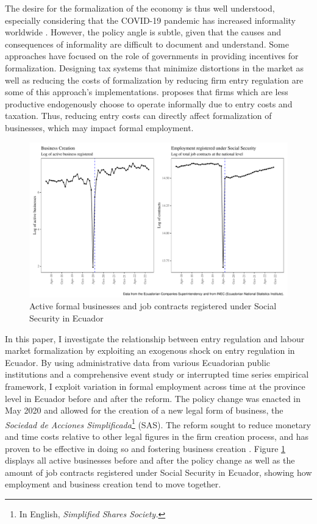 \documentclass[11pt,a4paper]{article}\usepackage[]{graphicx}\usepackage[]{xcolor}
\makeatletter
\def\maxwidth{ %
  \ifdim\Gin@nat@width>\linewidth
    \linewidth
  \else
    \Gin@nat@width
  \fi
}
\newenvironment{knitrout}{}{} %
\makeatother
\begin{document}
The desire for the formalization of the economy is thus well understood, especially considering that the COVID-19 pandemic has increased informality worldwide \parencite{ILO.2022}. However, the policy angle is subtle, given that the causes and consequences of informality are difficult to document and understand. Some approaches have focused on the role of governments in providing incentives for formalization. Designing tax systems that minimize distortions in the market \parencite{Bardey.2019} as well as reducing the costs of formalization by reducing firm entry regulation are some of this approach's implementations. \textcite{MauricioPrado.2011} proposes that firms which are less productive endogenously choose to operate informally due to entry costs and taxation. Thus, reducing entry costs can directly affect formalization of businesses, which may impact formal employment.

\begin{figure}[h]
\caption{Active formal businesses and job contracts registered under Social Security in Ecuador}
\label{fig:fig}
\begin{knitrout}
\color{fgcolor}
\includegraphics[width=\maxwidth]{figure/figure-1-1} 
\end{knitrout}
\end{figure}

In this paper, I investigate the relationship between entry regulation and labour market formalization by exploiting an exogenous shock on entry regulation in Ecuador. By using administrative data from various Ecuadorian public institutions and a comprehensive event study or interrupted time series empirical framework, I exploit variation in formal employment across time at the province level in Ecuador before and after the reform. The policy change was enacted in May 2020 and allowed for the creation of a new legal form of business, the \textit{Sociedad de Acciones Simplificada}\footnote{In English, \textit{Simplified Shares Society.}} (SAS). The reform sought to reduce monetary and time costs relative to other legal figures in the firm creation process, and has proven to be effective in doing so and fostering business creation \parencite{CaminoMogro.2022}. Figure \ref{fig:fig} displays all active businesses before and after the policy change as well as the amount of job contracts registered under Social Security in Ecuador, showing how employment and business creation tend to move together.
\end{document}
